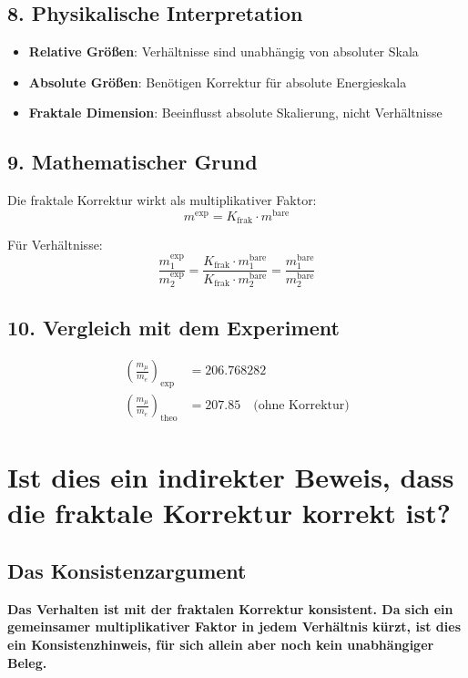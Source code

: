 \subsection{8. Physikalische Interpretation}

\begin{itemize}
	\item \textbf{Relative Größen}: Verhältnisse sind unabhängig von absoluter Skala
	\item \textbf{Absolute Größen}: Benötigen Korrektur für absolute Energieskala
	\item \textbf{Fraktale Dimension}: Beeinflusst absolute Skalierung, nicht Verhältnisse
\end{itemize}

\subsection{9. Mathematischer Grund}

Die fraktale Korrektur wirkt als multiplikativer Faktor:
\[
m^{\text{exp}} = K_{\text{frak}} \cdot m^{\text{bare}}
\]

Für Verhältnisse:
\[
\frac{m_1^{\text{exp}}}{m_2^{\text{exp}}} = \frac{K_{\text{frak}} \cdot m_1^{\text{bare}}}{K_{\text{frak}} \cdot m_2^{\text{bare}}} = \frac{m_1^{\text{bare}}}{m_2^{\text{bare}}}
\]

\subsection{10. Vergleich mit dem Experiment}

\begin{align*}
	\left(\frac{m_\mu}{m_e}\right)_{\text{exp}} &= 206.768282 \\
	\left(\frac{m_\mu}{m_e}\right)_{\text{theo}} &= 207.85 \quad \text{(ohne Korrektur)}
\end{align*}

\section{Ist dies ein indirekter Beweis, dass die fraktale Korrektur korrekt ist?}

\subsection{Das Konsistenzargument}

\begin{tcolorbox}[colback=green!5!white,colframe=green!75!black]
	\textbf{Das Verhalten ist mit der fraktalen Korrektur konsistent. Da sich ein gemeinsamer multiplikativer Faktor in jedem Verhältnis kürzt, ist dies ein Konsistenzhinweis, für sich allein aber noch kein unabhängiger Beleg.}
\end{tcolorbox}

